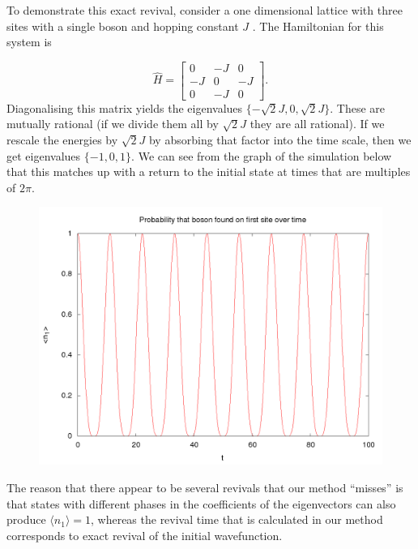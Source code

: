\documentclass[a4paper,10pt]{article}
\begin{document}
To demonstrate this exact revival, consider a one dimensional lattice with three sites with a single boson and hopping constant $J$ . The Hamiltonian for this system is

\begin{equation}
\hat{H}= \begin{bmatrix}
 0 & -J & 0 \\
 -J & 0 & -J\\
 0 & -J & 0
 \end{bmatrix}.
\end{equation}
Diagonalising this matrix yields the eigenvalues $\{-\sqrt{2}J,0,\sqrt{2}J\}$. These are mutually rational (if we divide them all by $\sqrt{2}J$ they are all rational). 
If we rescale the energies by $\sqrt{2}J$ by absorbing that factor into the time scale, then we get eigenvalues $\{-1,0,1\}$.
We can see from the graph of the simulation below that this matches up with a return to the initial state at times that are multiples of $2\pi$.

\begin{figure}[H]
 \begin{center}
 \includegraphics[width=1.0\textwidth]{showing_revival_3by1}
 \end{center}
\end{figure}

The reason that there appear to be several revivals that our method ``misses'' is that states with different phases in the coefficients of the eigenvectors can also produce $\langle n_1 \rangle =1$, whereas the revival time that is 
calculated in our method corresponds to exact revival of the initial wavefunction.
\end{document}
